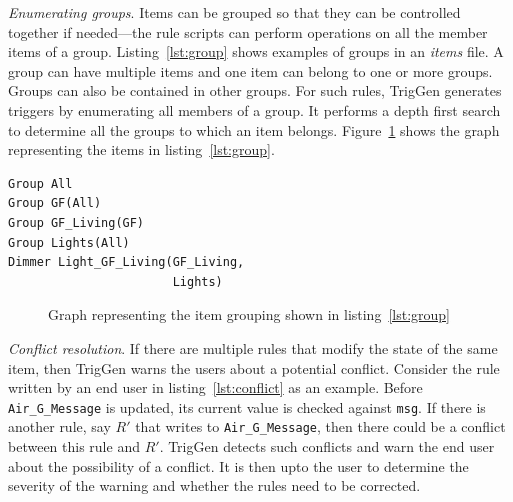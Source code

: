 \documentclass{sig-alternate-05-2015}
\begin{document}
\noindent \emph{Enumerating groups}. Items can be grouped so that they can be controlled together if needed---the rule scripts can perform operations on all the member items of a group. Listing~\ref{lst:group} shows examples of groups in an \textit{items} file.
A group can have multiple items and one item can belong to one or more groups. Groups can also be contained in other groups. For such rules, TrigGen generates triggers by enumerating all members of a group. It performs a depth first search to determine all the groups to which an item belongs. Figure~\ref{fig:graphstructure} shows the graph representing the items in listing~\ref{lst:group}. 
\begin{lstlisting}[caption={Grouping of items (GF stands for Ground Floor).},label={lst:group}]
Group All
Group GF(All)
Group GF_Living(GF) 										
Group Lights(All)
Dimmer Light_GF_Living(GF_Living,
                       Lights)
\end{lstlisting}
\begin{figure}
\centering
{}
\caption{Graph representing the item grouping shown in listing~\ref{lst:group}}
\label{fig:graphstructure} 
\end{figure}
\noindent \emph{Conflict resolution}. If there are multiple rules that modify the state of the same item, then TrigGen warns the users about a potential conflict. Consider the rule written by an end user in listing~\ref{lst:conflict} as an example. Before \texttt{Air\_G\_Message} is updated, its current value is checked against \texttt{msg}. If there is another rule, say $R'$ that writes to \texttt{Air\_G\_Message}, then there could be a conflict between this rule and $R'$. TrigGen detects such conflicts and warn the end user about the possibility of a conflict. It is then upto the user to determine the severity of the warning and whether the rules need to be corrected.
\end{document}
